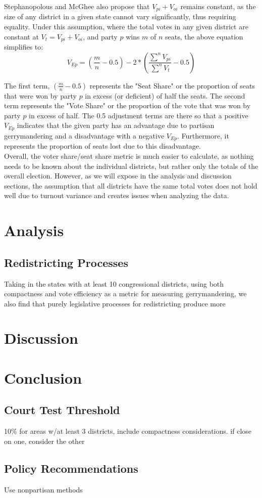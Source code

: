 \documentclass[12pt]{article}
\begin{document}
     Stephanopolous and McGhee also propose that $V_{pi}+V_{oi}$ remains constant, as the size of any district in a given state cannot vary significantly, thus requiring equality.  Under this assumption, where the total votes in any given district are constant at $V_{t} = V_{pi}+V_{oi}$, and party $p$ wins $m$ of $n$ seats, the above equation simplifies to:
     \[V_{Ep} = (\frac{m}{n}-0.5) - 2*(\frac{\sum^{n}V_{pi}}{\sum^n{V_t}}-0.5)\]
  
  The first term, $(\frac{m}{n}-0.5)$ represents the "Seat Share" or the proportion of seats that were won by party $p$ in excess (or deficient) of half the seats.  The second term represents the "Vote Share" or the proportion of the vote that was won by party $p$ in excess of half. The 0.5 adjustment terms are there so that a positive $V_{Ep}$ indicates that the given party has an advantage due to partisan gerrymandering and a disadvantage with a negative $V_{Ep}$.  Furthermore, it represents the proportion of seats lost due to this disadvantage.\\
  
  Overall, the voter share/seat share metric is much easier to calculate, as nothing needs to be known about the individual districts, but rather only the totals of the overall election.  However, as we will expose in the analysis and discussion sections, the assumption that all districts have the same total votes does not hold well due to turnout variance and creates issues when analyzing the data.\\
  

  \section{Analysis}
  
 \subsection{Redistricting Processes}
Taking in the states with at least 10 congressional districts, using both compactness and vote efficiency as a metric for measuring gerrymandering, we also find that purely legislative processes for redistricting produce more  
  \section{Discussion}

  \section{Conclusion}
  
  \subsection{Court Test Threshold}
  10\% for areas w/at least 3 districts, include compactness considerations.  if close on one, consider the other
  \subsection{Policy Recommendations}
  Use nonpartisan methods
  
  \singlespacing{}

  \printbibliography{}
\end{document}
